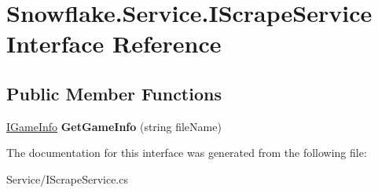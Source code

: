 \hypertarget{interface_snowflake_1_1_service_1_1_i_scrape_service}{}\section{Snowflake.\+Service.\+I\+Scrape\+Service Interface Reference}
\label{interface_snowflake_1_1_service_1_1_i_scrape_service}
\subsection*{Public Member Functions}
\begin{DoxyCompactItemize}
\item 
\hypertarget{interface_snowflake_1_1_service_1_1_i_scrape_service_a75fc36352cf276850467a502cd9a938d}{}\hyperlink{interface_snowflake_1_1_game_1_1_i_game_info}{I\+Game\+Info} {\bfseries Get\+Game\+Info} (string file\+Name)\label{interface_snowflake_1_1_service_1_1_i_scrape_service_a75fc36352cf276850467a502cd9a938d}

\end{DoxyCompactItemize}


The documentation for this interface was generated from the following file\+:\begin{DoxyCompactItemize}
\item 
Service/I\+Scrape\+Service.\+cs\end{DoxyCompactItemize}
